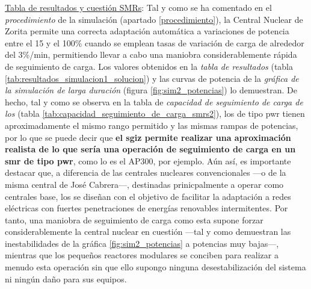 \underline{Tabla de resultados y cuestión SMRs}: Tal y como se ha comentado en el \textit{procedimiento} de la simulación (apartado \ref{procedimiento}), la Central Nuclear de Zorita permite una correcta adaptación automática a variaciones de potencia entre el 15 y el 100\% cuando se emplean tasas de variación de carga de alrededor del 3\%/min, permitiendo llevar a cabo una maniobra considerablemente rápida de seguimiento de carga. Los valores obtenidos en la \textit{tabla de resultados} (tabla \ref{tab:resultados_simulacion1_solucion}) y las curvas de potencia de la \textit{gráfica de la simulación de larga duración} (figura \ref{fig:sim2_potencias}) lo demuestran. De hecho, tal y como se observa en la tabla de \textit{capacidad de seguimiento de carga de los } (tabla \ref{tab:capacidad_seguimiento_de_carga_smrs2}), los  de tipo \acrshort{pwr} tienen aproximadamente el mismo rango permitido y las mismas rampas de potencias, por lo que se puede decir que \textbf{el \acrshort{sgiz} permite realizar una aproximación realista de lo que sería una operación de seguimiento de carga en un \acrshort{smr} de tipo \acrshort{pwr}}, como lo es el AP300, por ejemplo. Aún así, es importante destacar que, a diferencia de las centrales nucleares convencionales ---o de la misma central de José Cabrera---, destinadas prinicpalmente a operar como centrales base, los  se diseñan con el objetivo de facilitar la adaptación a redes eléctricas con fuertes penetraciones de energías renovables intermitentes. Por tanto, una maniobra de seguimiento de carga como esta supone forzar considerablemente la central nuclear en cuestión ---tal y como demuestran las inestabilidades de la gráfica \ref{fig:sim2_potencias} a potencias muy bajas---, mientras que los pequeños reactores modulares se conciben para realizar a menudo esta operación sin que ello supongo ninguna desestabilización del sistema ni ningún daño para sus equipos.

